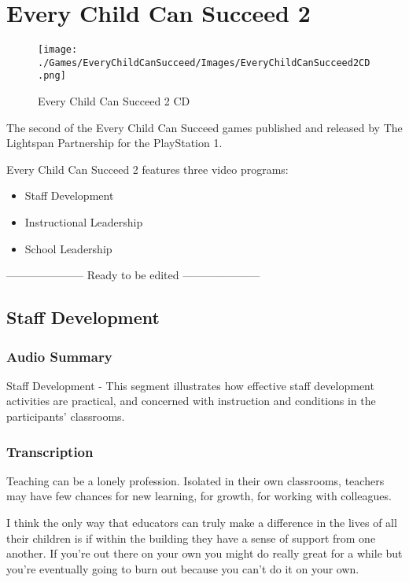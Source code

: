 \chapter{Every Child Can Succeed 2}

\begin{figure}[H]
    \centering
    \texttt{[image: ./Games/EveryChildCanSucceed/Images/EveryChildCanSucceed2CD.png]}
    \caption{Every Child Can Succeed 2 CD}
\end{figure}

The second of the Every Child Can Succeed games published and released by The Lightspan Partnership for the PlayStation 1.

Every Child Can Succeed 2 features three video programs:

\begin{itemize}
    \item Staff Development
    \item Instructional Leadership
    \item School Leadership
\end{itemize}

\clearpage
\newpage

--------------------- Ready to be edited ---------------------

\section{Staff Development}

\subsection{Audio Summary}

Staff Development - This segment illustrates how effective staff development activities are practical, and concerned with instruction and conditions in the participants' classrooms.

\subsection{Transcription}

Teaching can be a lonely profession.
Isolated in their own classrooms, teachers may have few chances for new learning, for growth, for working with colleagues.

I think the only way that educators can truly make a difference in the lives of all their children is if within the building they have a sense of support from one another.
If you're out there on your own you might do really great for a while but you're eventually going to burn out because you can't do it on your own.


